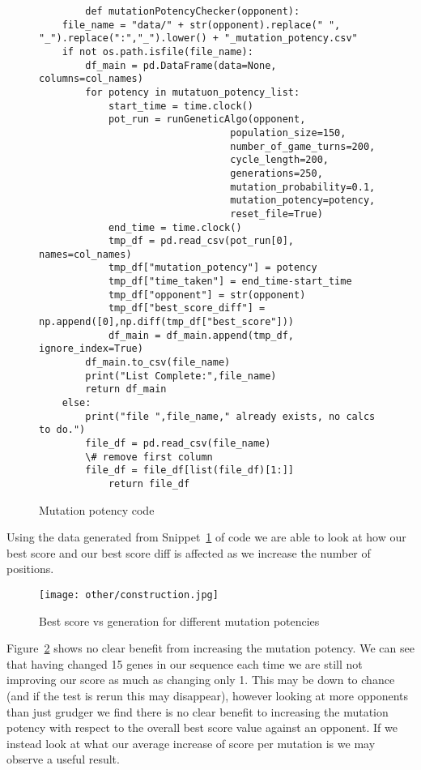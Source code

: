 \begin{figure}
    \begin{verbatim}
        def mutationPotencyChecker(opponent):
    file_name = "data/" + str(opponent).replace(" ", "_").replace(":","_").lower() + "_mutation_potency.csv"
    if not os.path.isfile(file_name):
        df_main = pd.DataFrame(data=None, columns=col_names)
        for potency in mutatuon_potency_list:
            start_time = time.clock()
            pot_run = runGeneticAlgo(opponent,
                                 population_size=150,
                                 number_of_game_turns=200,
                                 cycle_length=200, 
                                 generations=250,
                                 mutation_probability=0.1,
                                 mutation_potency=potency,
                                 reset_file=True)
            end_time = time.clock()
            tmp_df = pd.read_csv(pot_run[0], names=col_names)
            tmp_df["mutation_potency"] = potency
            tmp_df["time_taken"] = end_time-start_time
            tmp_df["opponent"] = str(opponent)
            tmp_df["best_score_diff"] = np.append([0],np.diff(tmp_df["best_score"]))
            df_main = df_main.append(tmp_df, ignore_index=True)
        df_main.to_csv(file_name)
        print("List Complete:",file_name)
        return df_main
    else:
        print("file ",file_name," already exists, no calcs to do.")
        file_df = pd.read_csv(file_name) 
        \# remove first column
        file_df = file_df[list(file_df)[1:]]
            return file_df
    \end{verbatim}
    \caption{Mutation potency code}\label{code:mutationPotencyChecker}    
\end{figure}

Using the data generated from Snippet~\ref{code:mutationPotencyChecker} of code we are able to look at how our best score and our best score diff is affected as we increase the number of positions.\\

\begin{figure}
    \texttt{[image: other/construction.jpg]}
    \caption{Best score vs generation for different mutation potencies}\label{fig:MUT-POT-bs-v-gen-all}
\end{figure}

Figure~\ref{fig:MUT-POT-bs-v-gen-all} shows no clear benefit from increasing the mutation potency. 
We can see that having changed 15 genes in our sequence each time we are still not improving our score as much as changing only 1. 
This may be down to chance (and if the test is rerun this may disappear), however looking at more opponents than just grudger we find there is no clear benefit to increasing the mutation potency with respect to the overall best score value against an opponent. 
If we instead look at what our average increase of score per mutation is we may observe a useful result.\\

